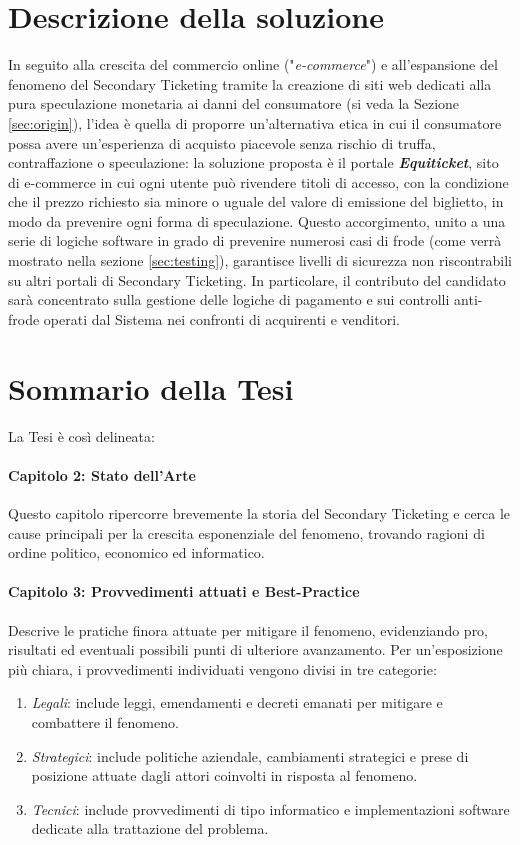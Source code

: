 \section{Descrizione della soluzione} \label{sec:desc}
In seguito alla crescita del commercio online ("\textit{e-commerce}") e all'espansione del fenomeno del Secondary Ticketing tramite la creazione di siti web dedicati alla pura speculazione monetaria ai danni del consumatore (si veda la Sezione \ref{sec:origin}), l'idea è quella di proporre un'alternativa etica in cui il consumatore possa avere un'esperienza di acquisto piacevole senza rischio di truffa, contraffazione o speculazione: la soluzione proposta è il portale \textbf{\textit{Equiticket}}, sito di e-commerce in cui ogni utente può rivendere titoli di accesso, con la condizione che il prezzo richiesto sia minore o uguale del valore di emissione del biglietto, in modo da prevenire ogni forma di speculazione. Questo accorgimento, unito a una serie di logiche software in grado di prevenire numerosi casi di frode (come verrà mostrato nella sezione \ref{sec:testing}), garantisce livelli di sicurezza non riscontrabili su altri portali di Secondary Ticketing. In particolare, il contributo del candidato sarà concentrato sulla gestione delle logiche di pagamento e sui controlli anti-frode operati dal Sistema nei confronti di acquirenti e venditori. 
\section{Sommario della Tesi} \label{sec:sommario}
La Tesi è così delineata:
\paragraph*{Capitolo 2: Stato dell'Arte} 
Questo capitolo ripercorre brevemente la storia del Secondary Ticketing e cerca le cause principali per la crescita esponenziale del fenomeno, trovando ragioni di ordine politico, economico ed informatico.
\paragraph*{Capitolo 3: Provvedimenti attuati e Best-Practice} 
Descrive le pratiche finora attuate per mitigare il fenomeno, evidenziando pro, risultati ed eventuali possibili punti di ulteriore avanzamento. Per un'esposizione più chiara, i provvedimenti individuati vengono divisi in tre categorie: 
\begin{enumerate}
\item \emph{Legali}: include leggi, emendamenti e decreti emanati per mitigare e combattere il fenomeno. 
\item \emph{Strategici}: include politiche aziendale, cambiamenti strategici e prese di posizione attuate dagli attori coinvolti in risposta al fenomeno. 
\item \emph{Tecnici}: include provvedimenti di tipo informatico e implementazioni software dedicate alla trattazione del problema. 
\end{enumerate}
